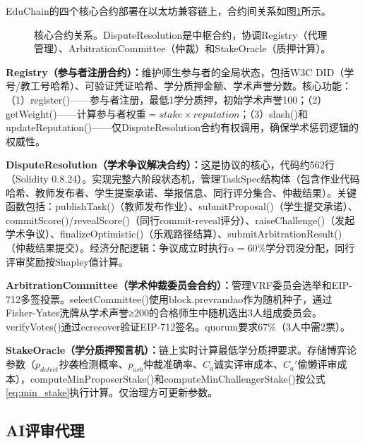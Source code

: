 \documentclass[10.5pt,compsoc]{CjC}
\begin{document}
EduChain的四个核心合约部署在以太坊兼容链上，合约间关系如图\ref{fig:contracts}所示。

\begin{figure}[H]
\centering
{}
\caption{核心合约关系。DisputeResolution是中枢合约，协调Registry（代理管理）、ArbitrationCommittee（仲裁）和StakeOracle（质押计算）。}
\label{fig:contracts}
\end{figure}

\textbf{Registry（参与者注册合约）：}维护师生参与者的全局状态，包括W3C DID（学号/教工号哈希）、可验证凭证哈希、学分质押金额、学术声誉分数。核心功能：（1）register()——参与者注册，最低1学分质押，初始学术声誉100；（2）getWeight()——计算参与者权重$= stake \times reputation$；（3）slash()和updateReputation()——仅DisputeResolution合约有权调用，确保学术惩罚逻辑的权威性。

\textbf{DisputeResolution（学术争议解决合约）：}这是协议的核心，代码约562行（Solidity 0.8.24）。实现完整六阶段状态机，管理TaskSpec结构体（包含作业代码哈希、教师发布者、学生提案承诺、举报信息、同行评分集合、仲裁结果）。关键函数包括：publishTask()（教师发布作业）、submitProposal()（学生提交承诺）、commitScore()/revealScore()（同行commit-reveal评分）、raiseChallenge()（发起学术争议）、finalizeOptimistic()（乐观路径结算）、submitArbitrationResult()（仲裁结果提交）。经济分配逻辑：争议成立时执行$\alpha=60\%$学分罚没分配，同行评审奖励按Shapley值计算。

\textbf{ArbitrationCommittee（学术仲裁委员会合约）：}管理VRF委员会选举和EIP-712多签投票。selectCommittee()使用block.prevrandao作为随机种子，通过Fisher-Yates洗牌从学术声誉≥200的合格师生中随机选出3人组成委员会。verifyVotes()通过ecrecover验证EIP-712签名。quorum要求67\%（3人中需2票）。

\textbf{StakeOracle（学分质押预言机）：}链上实时计算最低学分质押要求。存储博弈论参数（$p_{detect}$抄袭检测概率、$p_{arb}$仲裁准确率、$C_a$诚实评审成本、$C_a'$偷懒评审成本），computeMinProposerStake()和computeMinChallengerStake()按公式\ref{eq:min_stake}执行计算。仅治理方可更新参数。

\subsection{AI评审代理}
\end{document}
